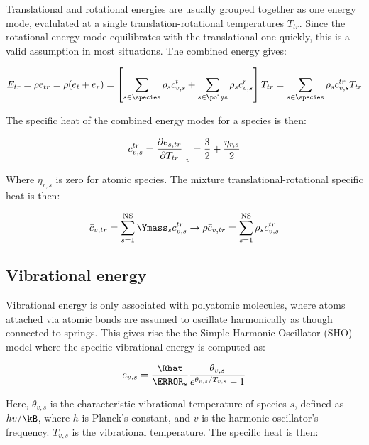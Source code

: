 \documentclass[10pt]{article}
\begin{document}
\begin{flushleft}
Translational and rotational energies are usually grouped together as one energy mode, evalulated at a single translation-rotational temperatures $T_{tr}$. Since the rotational energy mode equilibrates with the translational one quickly, this is a valid assumption in most situations. The combined energy gives:

\begin{equation*}
    E_{tr} = \rho e_{tr} = \rho (e_t + e_r) = \bb{\sum_{s \in \species} \rho_s c_{v,s}^t + \sum_{s \in \polys} \rho_s c_{v,s}^r} T_{tr} =  \sum_{s \in \species} \rho_s c_{v,s}^{tr} T_{tr}
    \label{eq:trans-rot-energy}
\end{equation*}

The specific heat of the combined energy modes for a species is then:

\begin{equation*}
    c_{v,s}^{tr} = \frac{\partial e_{s, tr}}{\partial T_{tr}}\bigg|_v = \frac{3}{2} + \frac{\eta_{r,s}}{2}
\end{equation*}

Where $\eta_{r,s}$ is zero for atomic species. The mixture translational-rotational specific heat is then:

\begin{equation*}
    \bar{c}_{v,tr} = \sum_{s=1}^\text{NS} \Ymass_s c_{v,s}^{tr} \rightarrow \rho \bar{c}_{v,tr} = \sum_{s=1}^\text{NS} \rho_s c_{v,s}^{tr}
    \label{eq:cvbar}
\end{equation*}

\subsection{Vibrational energy}

Vibrational energy is only associated with polyatomic molecules, where atoms attached via atomic bonds are assumed to oscillate harmonically as though connected to springs. This gives rise the the Simple Harmonic Oscillator (SHO) model where the specific vibrational energy is computed as:

\begin{equation*}
    e_{v,s} = \frac{\Rhat}{\MW_s} \frac{\theta_{v,s}}{e^{\theta_{v,s} / T_{v,s}} - 1} 
\end{equation*}

Here, $\theta_{v,s}$ is the characteristic vibrational temperature of species $s$, defined as $hv/\kB$, where $h$ is Planck's constant, and $v$ is the harmonic oscillator's frequency. $T_{v,s}$ is the vibrational temperature. The specific heat is then:


\end{flushleft}
\end{document}
